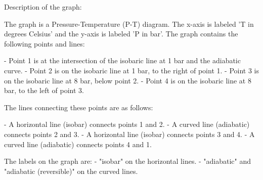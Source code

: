 Description of the graph:

The graph is a Pressure-Temperature (P-T) diagram. The x-axis is labeled 'T in degrees Celsius' and the y-axis is labeled 'P in bar'. The graph contains the following points and lines:

- Point 1 is at the intersection of the isobaric line at 1 bar and the adiabatic curve.
- Point 2 is on the isobaric line at 1 bar, to the right of point 1.
- Point 3 is on the isobaric line at 8 bar, below point 2.
- Point 4 is on the isobaric line at 8 bar, to the left of point 3.

The lines connecting these points are as follows:

- A horizontal line (isobar) connects points 1 and 2.
- A curved line (adiabatic) connects points 2 and 3.
- A horizontal line (isobar) connects points 3 and 4.
- A curved line (adiabatic) connects points 4 and 1.

The labels on the graph are:
- "isobar" on the horizontal lines.
- "adiabatic" and "adiabatic (reversible)" on the curved lines.